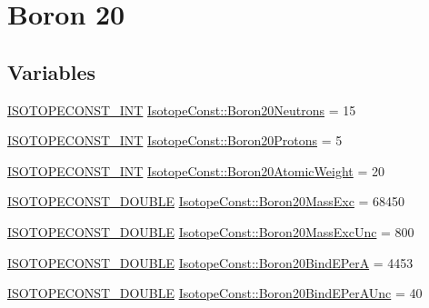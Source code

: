 \hypertarget{group___isotope_const-_boron-_b20}{}\section{Boron 20}
\label{group___isotope_const-_boron-_b20}
\subsection*{Variables}
\begin{DoxyCompactItemize}
\item 
\mbox{\hyperlink{group___isotope_const-_macros_ga5f18360b3e99483a35c32d789e62621c}{I\+S\+O\+T\+O\+P\+E\+C\+O\+N\+S\+T\+\_\+\+I\+NT}} \mbox{\hyperlink{group___isotope_const-_boron-_b20_ga3e6c7dea11b03b759ea4678d37fe4a37}{Isotope\+Const\+::\+Boron20\+Neutrons}} = 15
\item 
\mbox{\hyperlink{group___isotope_const-_macros_ga5f18360b3e99483a35c32d789e62621c}{I\+S\+O\+T\+O\+P\+E\+C\+O\+N\+S\+T\+\_\+\+I\+NT}} \mbox{\hyperlink{group___isotope_const-_boron-_b20_ga15afca8da55efb47a8998132edd99fd9}{Isotope\+Const\+::\+Boron20\+Protons}} = 5
\item 
\mbox{\hyperlink{group___isotope_const-_macros_ga5f18360b3e99483a35c32d789e62621c}{I\+S\+O\+T\+O\+P\+E\+C\+O\+N\+S\+T\+\_\+\+I\+NT}} \mbox{\hyperlink{group___isotope_const-_boron-_b20_ga69dea838e918b19c9cc3e438d7ca9153}{Isotope\+Const\+::\+Boron20\+Atomic\+Weight}} = 20
\item 
\mbox{\hyperlink{group___isotope_const-_macros_ga8f45a7272ce02c0b4c65c44636ed719a}{I\+S\+O\+T\+O\+P\+E\+C\+O\+N\+S\+T\+\_\+\+D\+O\+U\+B\+LE}} \mbox{\hyperlink{group___isotope_const-_boron-_b20_ga409ae9a451bc8ff76166b500d7c04225}{Isotope\+Const\+::\+Boron20\+Mass\+Exc}} = 68450
\item 
\mbox{\hyperlink{group___isotope_const-_macros_ga8f45a7272ce02c0b4c65c44636ed719a}{I\+S\+O\+T\+O\+P\+E\+C\+O\+N\+S\+T\+\_\+\+D\+O\+U\+B\+LE}} \mbox{\hyperlink{group___isotope_const-_boron-_b20_ga9eb1c4850e6159d4b5ef007254b84eb3}{Isotope\+Const\+::\+Boron20\+Mass\+Exc\+Unc}} = 800
\item 
\mbox{\hyperlink{group___isotope_const-_macros_ga8f45a7272ce02c0b4c65c44636ed719a}{I\+S\+O\+T\+O\+P\+E\+C\+O\+N\+S\+T\+\_\+\+D\+O\+U\+B\+LE}} \mbox{\hyperlink{group___isotope_const-_boron-_b20_ga67bcbe5ce1c98a30b270bd6b8068c6df}{Isotope\+Const\+::\+Boron20\+Bind\+E\+PerA}} = 4453
\item 
\mbox{\hyperlink{group___isotope_const-_macros_ga8f45a7272ce02c0b4c65c44636ed719a}{I\+S\+O\+T\+O\+P\+E\+C\+O\+N\+S\+T\+\_\+\+D\+O\+U\+B\+LE}} \mbox{\hyperlink{group___isotope_const-_boron-_b20_ga4fcadb48de3689f6639f6dacb1ef6035}{Isotope\+Const\+::\+Boron20\+Bind\+E\+Per\+A\+Unc}} = 40

\end{DoxyCompactItemize}
